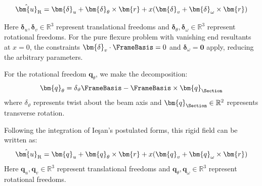 \begin{equation}
\hat{\bm{u}}_{\rm R} = \bm{\delta}_u + \bm{\delta}_\theta \times \bm{r} + x(\bm{\delta}_v + \bm{\delta}_\omega \times \bm{r})
\end{equation}

Here $\bm{\delta}_u, \bm{\delta}_v \in \mathbb{R}^3$ represent translational freedoms and $\bm{\delta}_\theta, \bm{\delta}_\omega \in \mathbb{R}^3$ represent rotational freedoms. For the pure flexure problem with vanishing end resultants at $x=0$, the constraints $\bm{\delta}_v \cdot \FrameBasis = 0$ and $\bm{\delta}_\omega = \mathbf{0}$ apply, reducing the arbitrary parameters.



\begin{Quote}
For the rotational freedom $\bm{q}_\theta$, we make the decomposition:
%
\begin{equation*}
\bm{q}_\theta = \delta_\vartheta\FrameBasis - \FrameBasis \times \bm{q}_{\Section}
\end{equation*}
%
where $\delta_\vartheta$ represents twist about the beam axis and $\bm{q}_{\Section} \in \mathbb{R}^2$ represents transverse rotation. 
\end{Quote}
\begin{Quote}
Following the integration of Ie\c{s}an's postulated forms, this rigid field can be written as:
%
\begin{equation*}
\hat{\bm{u}}_{\rm R} = \bm{q}_u + \bm{q}_\theta \times \bm{r} + x(\bm{q}_v + \bm{q}_\omega \times \bm{r})
\end{equation*}
%
Here $\bm{q}_u, \bm{q}_v \in \mathbb{R}^3$ represent translational freedoms and $\bm{q}_\theta, \bm{q}_\omega \in \mathbb{R}^3$ represent rotational freedoms. 
\end{Quote}